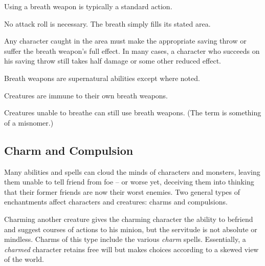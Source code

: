 \begin{itemize*}
\item Using a breath weapon is typically a standard action.
\item No attack roll is necessary. The breath simply fills its stated area.
\item Any character caught in the area must make the appropriate saving throw or suffer the breath weapon's full effect. In many cases, a character who succeeds on his saving throw still takes half damage or some other reduced effect.
\item Breath weapons are supernatural abilities except where noted.
\item Creatures are immune to their own breath weapons.
\item Creatures unable to breathe can still use breath weapons. (The term is something of a misnomer.)
\end{itemize*}

\subsection{Charm and Compulsion}

Many abilities and spells can cloud the minds of characters and monsters, leaving 
them unable to tell friend from foe -- or worse yet, deceiving them into thinking 
that their former friends are now their worst enemies. Two general types of enchantments 
affect characters and creatures: charms and compulsions.

Charming another creature gives the charming character the ability to befriend 
and suggest courses of actions to his minion, but the servitude is not absolute 
or mindless. Charms of this type include the various \textit{charm} spells. Essentially, 
a \textit{charmed} character retains free will but makes choices according to a 
skewed view of the world.

